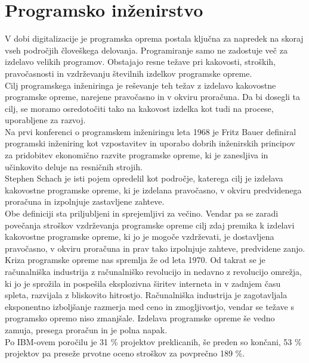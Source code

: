 \documentclass[a4paper,12pt,openright]{book}
\begin{document}
\section{Programsko inženirstvo} \label{chap:prog-inz}
V dobi digitalizacije je programska oprema postala ključna za napredek na skoraj vseh področjih človeškega delovanja. Programiranje samo ne zadostuje več za izdelavo velikih programov. Obstajajo resne težave pri kakovosti, stroških, pravočasnosti in vzdrževanju številnih izdelkov programske opreme.\\
Cilj programskega inženiringa je reševanje teh težav z izdelavo kakovostne programske opreme, narejene pravočasno in v okviru proračuna. Da bi dosegli ta cilj, se moramo osredotočiti tako na kakovost izdelka kot tudi na procese, uporabljene za razvoj.\cite{aggarwal2005software} \\
Na prvi konferenci o programskem inženiringu leta 1968 je Fritz Bauer \cite{randell19961968} definiral programski inženiring kot vzpostavitev in uporabo dobrih inženirskih principov za pridobitev ekonomično razvite programske opreme, ki je zanesljiva in učinkovito deluje na resničnih strojih. \\
Stephen Schach je isti pojem opredelil kot področje, katerega cilj je izdelava kakovostne programske opreme, ki je izdelana pravočasno, v okviru predvidenega proračuna in izpolnjuje zastavljene zahteve.\cite{randell19961968} \\ Obe definiciji sta priljubljeni in sprejemljivi za večino. Vendar pa se zaradi povečanja stroškov vzdrževanja programske opreme cilj zdaj premika k izdelavi kakovostne programske opreme, ki jo je mogoče vzdrževati, je dostavljena pravočasno, v okviru proračuna in prav tako izpolnjuje zahteve, predvidene zanjo. \\
\sloppy
Kriza programske opreme nas spremlja že od leta 1970. Od takrat se je računalniška industrija z računalniško revolucijo in nedavno z revolucijo omrežja, ki jo je sprožila in  pospešila eksplozivna širitev interneta in v zadnjem času spleta, razvijala z bliskovito hitrostjo.
Računalniška industrija je zagotavljala eksponentno izboljšanje razmerja med ceno in zmogljivostjo, vendar se težave s programsko opremo niso zmanjšale. Izdelava programske opreme še vedno zamuja, presega proračun in je polna napak. \cite{aggarwal2005software} \\
Po IBM-ovem poročilu je 31 \% projektov preklicanih, še preden so končani, 53 \% projektov pa preseže prvotne oceno stroškov za povprečno 189 \%.\cite{boehm2006view}
\end{document}
